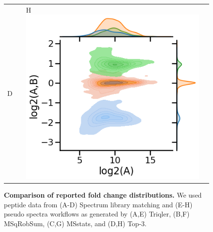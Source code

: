 \documentclass[10pt,letterpaper]{article}
\begin{document}
\begin{figure}[hbt]
\begin{tabular}{lclc}
        D  & &%
        H \includegraphics[width=0.35\linewidth]{../../result/report_plots/diann_scatter_top3.png} & %
    \end{tabular}
    \caption{{\bf Comparison of reported fold change distributions.} We used peptide data from (A-D) Spectrum library matching and (E-H) pseudo spectra workflows as generated by 
    (A,E) Triqler, (B,F) MSqRobSum, (C,G) MSstats, and (D,H) Top-3. \label{fig:fc_histogram}}
\end{figure}
\fi


\end{document}
